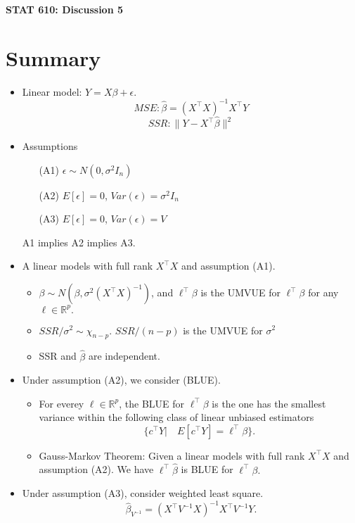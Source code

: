\documentclass[12pt]{extarticle}
\begin{document}
\begin{center}
{\large \bf STAT 610: Discussion 5}
\end{center}
\vspace{0.22cm}

\section{Summary}
\begin{itemize}
	\item Linear model: $Y=X\beta+\epsilon.$
	$$MSE: \hat{\beta}=(X^\top X)^{-1}X^\top Y$$
	$$SSR: \|  Y-X^\top \hat{\beta}\|^2$$ 
	\item Assumptions
	\begin{itemize}
\item [(A1)] $\epsilon\sim N(0,\sigma^2 I_n)$
\item [(A2)] $E[\epsilon]=0$, $Var(\epsilon)=\sigma^2 I_n$
\item [(A3)] $E[\epsilon]=0$, $Var(\epsilon)=V$
	\end{itemize}
A1 implies A2 implies A3.
\item A linear models with full rank $X^\top X$ and assumption (A1). 
\begin{itemize}
	\item $\beta\sim N(\beta,\sigma^2 (X^\top X)^{-1})$, and $\ell ^\top \beta$ is the UMVUE for $\ell^\top\beta$ for any $\ell\in \mathbb{R}^p.$
	\item $SSR/\sigma^2\sim \chi_{n-p}$. $SSR/(n-p)$ is the UMVUE for $\sigma^2$
	\item SSR and $\hat{\beta}$ are independent.
\end{itemize}
\item Under assumption (A2), we consider (BLUE).
\begin{itemize}
\item For everey $\ell\in \mathbb{R}^p$, the BLUE for $\ell^\top \beta$ is the one has the smallest variance within the following class of linear unbiased estimators
$$ \{c^\top Y| \quad E [c^\top Y]=\ell^\top \beta  \}.$$
\item Gauss-Markov Theorem: Given a linear models with full rank $X^\top X$ and assumption (A2).  We have
$\ell^\top \hat\beta$  is BLUE for $\ell^\top \beta.$
\end{itemize}
\item Under assumption (A3), consider weighted least square.
$$\hat{\beta}_{V^{-1}}=(X^\top V^{-1} X) ^{-1} X^\top V^{-1}Y.$$
\end{itemize}
\newpage
\end{document}

